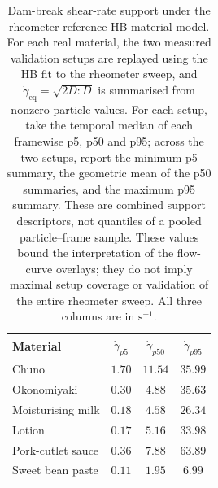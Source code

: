 \begin{table}[!htbp]
\centering
\footnotesize
\setlength{\tabcolsep}{4pt}
\caption{Dam-break shear-rate support under the rheometer-reference HB
material model. For each real material, the two measured validation
setups are replayed using the HB fit to the rheometer sweep, and
$\dot\gamma_{\mathrm{eq}}=\sqrt{2D:D}$ is summarised from nonzero
particle values. For each setup, take the temporal median of each
framewise p5, p50 and p95; across the two setups, report the minimum
p5 summary, the geometric mean of the p50 summaries, and the maximum
p95 summary. These are combined support descriptors, not quantiles
of a pooled particle--frame sample. These
values bound the interpretation of the flow-curve overlays; they do not
imply maximal setup coverage or validation of the entire rheometer
sweep. All three columns are in $\mathrm{s}^{-1}$.}
\label{tab:gammadot-real}
\begin{tabular}{@{}lccc@{}}
\toprule
Material & $\dot\gamma_{p5}$ & $\dot\gamma_{p50}$ &
$\dot\gamma_{p95}$ \\
\midrule
Chuno              & $1.70$ & $11.54$ & $35.99$ \\
Okonomiyaki        & $0.30$ & $4.88$  & $35.63$ \\
Moisturising milk  & $0.18$ & $4.58$  & $26.34$ \\
Lotion             & $0.17$ & $5.16$  & $33.98$ \\
Pork-cutlet sauce  & $0.36$ & $7.88$  & $63.89$ \\
Sweet bean paste   & $0.11$ & $1.95$  & $6.99$ \\
\bottomrule
\end{tabular}
\end{table}

